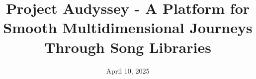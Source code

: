 \documentclass{src/ecsgdp}
\begin{document}
\frontmatter
\title{
    Project Audyssey - A Platform for Smooth Multidimensional Journeys Through Song Libraries
}
\date       {April 10, 2025}
\keywords   {}
\maketitle

\begin{abstract}

\end{abstract}



\tableofcontents
\listoffigures
\listoftables
\lstlistoflistings



\mainmatter







\backmatter



\appendix

\end{document}
